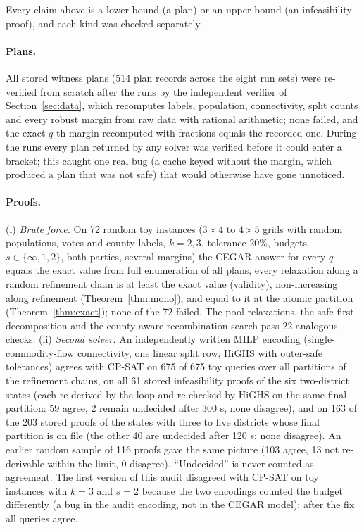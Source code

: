 Every claim above is a lower bound (a plan) or an upper bound (an infeasibility proof), and each kind was checked separately.

\paragraph{Plans.}
All stored witness plans (514 plan records across the eight run sets) were re-verified from scratch after the runs by the independent verifier of Section~\ref{sec:data}, which recomputes labels, population, connectivity, split counts and every robust margin from raw data with rational arithmetic; none failed, and the exact $q$-th margin recomputed with fractions equals the recorded one. During the runs every plan returned by any solver was verified before it could enter a bracket; this caught one real bug (a cache keyed without the margin, which produced a plan that was not safe) that would otherwise have gone unnoticed.

\paragraph{Proofs.}
(i) \emph{Brute force.} On 72 random toy instances ($3\times4$ to $4\times5$ grids with random populations, votes and county labels, $k=2,3$, tolerance 20\%, budgets $s\in\{\infty,1,2\}$, both parties, several margins) the CEGAR answer for every $q$ equals the exact value from full enumeration of all plans, every relaxation along a random refinement chain is at least the exact value (validity), non-increasing along refinement (Theorem~\ref{thm:mono}), and equal to it at the atomic partition (Theorem~\ref{thm:exact}); none of the 72 failed. The pool relaxations, the safe-first decomposition and the county-aware recombination search pass 22 analogous checks. (ii) \emph{Second solver.} An independently written MILP encoding (single-commodity-flow connectivity, one linear split row, HiGHS with outer-safe tolerances) agrees with CP-SAT on 675 of 675 toy queries over all partitions of the refinement chains, on all 61 stored infeasibility proofs of the six two-district states (each re-derived by the loop and re-checked by HiGHS on the same final partition: 59 agree, 2 remain undecided after 300 s, none disagree), and on 163 of the 203 stored proofs of the states with three to five districts whose final partition is on file (the other 40 are undecided after 120 s; none disagree). An earlier random sample of 116 proofs gave the same picture (103 agree, 13 not re-derivable within the limit, 0 disagree). ``Undecided'' is never counted as agreement. The first version of this audit disagreed with CP-SAT on toy instances with $k=3$ and $s=2$ because the two encodings counted the budget differently (a bug in the audit encoding, not in the CEGAR model); after the fix all queries agree.

